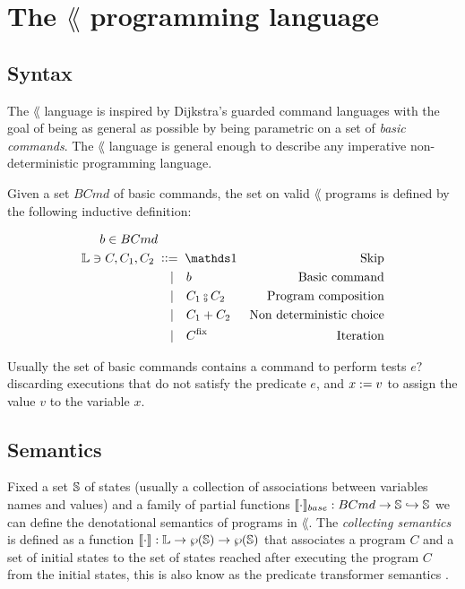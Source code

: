 \documentclass[
  10pt,       %
  twoside,    %
  a4paper,    %
  english,    %
  tikz,       %
  openright,  %
]{book}
\begin{document}
\section{The $\lang$ programming language}

\subsection{Syntax}

The $\lang$ language is inspired by Dijkstra's guarded command languages
\cite{Dijkstra74} with the goal of being as general as possible by being
parametric on a set of \textit{basic commands}. The $\lang$ language is general
enough to describe any imperative non-deterministic programming language.

\begin{definition}
  Given a set $BCmd$ of basic commands, the set on valid $\lang$ programs is 
  defined by the following inductive definition:

  \begin{align*}
    b \in BCmd \\
    \lang \ni C, C_1, C_2 \; & \cceq \sskip        & \text{Skip}\\
                             & \smid b             & \text{Basic command}\\
                             & \smid C_1 \fcmp C_2 & \text{Program composition}\\
                             & \smid C_1 + C_2     & \text{Non deterministic choice}\\
                             & \smid C^\fix        & \text{Iteration}\\
  \end{align*}

  \begin{example} \label{exmp:base-commands-syntax}
    Usually the set of basic commands contains a command to perform tests $e ?$
    discarding executions that do not satisfy the predicate $e$, and $x := v$
    to assign the value $v$ to the variable $x$.
  \end{example}
\end{definition}


\subsection{Semantics}

Fixed a set $\mathbb{S}$ of states (usually a collection of associations between
variables names and values) and a family of partial functions $\llbracket \cdot \rrbracket_{base} :
BCmd \to \mathbb{S} \hookrightarrow \mathbb{S}$ we can define the denotational semantics
of programs in $\lang$. The \textit{collecting semantics} is defined as a function
$\llbracket \cdot \rrbracket : \mathbb{L} \to \wp(\mathbb{S}) \to \wp(\mathbb{S})$ that associates a
program $C$ and a set of initial states to the set of states reached after
executing the program $C$ from the initial states, this is also know as the
predicate transformer semantics \cite{Dijkstra74}.
\end{document}
